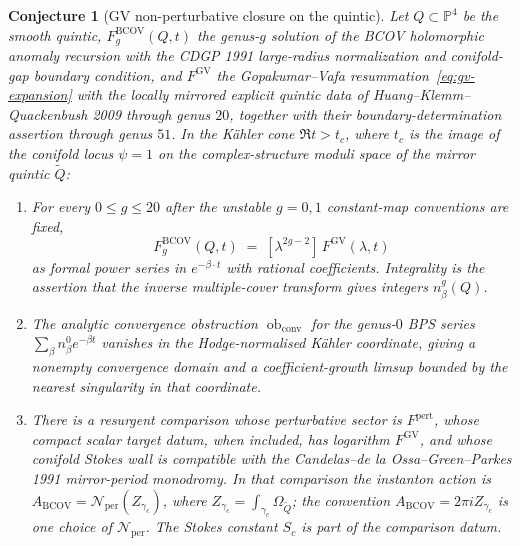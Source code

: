\documentclass[12pt]{amsart}
\newtheorem{conj}[thm]{Conjecture}
\theoremstyle{remark}
\renewcommand{\P}{\mathbb{P}}
\begin{document}
\begin{conj}[GV non-perturbative closure on the quintic]
  \label{conj:bcov-np-quintic}
  Let $Q \subset \P^4$ be the smooth quintic, $F^{\mathrm{BCOV}}_g(Q,
  t)$ the genus-$g$ solution of the BCOV holomorphic anomaly recursion
  with the CDGP 1991 large-radius normalization and conifold-gap boundary
  condition, and $F^{\mathrm{GV}}$ the Gopakumar--Vafa
  resummation~\eqref{eq:gv-expansion} with the locally mirrored
  explicit quintic data of Huang--Klemm--Quackenbush 2009 through
  genus \(20\), together with their boundary-determination assertion
  through genus \(51\).  In the K\"ahler cone $\Re t > t_c$, where $t_c$ is the image
  of the conifold locus $\psi = 1$ on the complex-structure moduli
  space of the mirror quintic $\widetilde Q$:
  \begin{enumerate}
    \item[(i)] For every $0 \leq g \leq 20$ after the unstable
      \(g=0,1\) constant-map conventions are fixed,
      \[
        F^{\mathrm{BCOV}}_g(Q, t) \;=\; [\lambda^{2g - 2}]\, F^{\mathrm{GV}}(\lambda, t)
      \]
      as formal power series in \(e^{-\beta\cdot t}\) with rational
      coefficients.  Integrality is the assertion that the inverse
      multiple-cover transform gives integers \(n_\beta^g(Q)\).
    \item[(ii)] The analytic convergence obstruction
      \(\operatorname{ob}_{\mathrm{conv}}\) for the genus-\(0\) BPS series
      \(\sum_\beta n_\beta^0 e^{-\beta t}\) vanishes in the
      Hodge-normalised K\"ahler coordinate, giving a nonempty convergence
      domain and a coefficient-growth limsup bounded by the nearest
      singularity in that coordinate.
    \item[(iii)] There is a resurgent comparison whose perturbative
      sector is \(F^{\mathrm{pert}}\), whose compact scalar target datum,
      when included, has logarithm \(F^{\mathrm{GV}}\), and whose conifold
      Stokes wall is compatible with the
      Candelas--de la Ossa--Green--Parkes 1991 mirror-period monodromy.
      In that comparison the instanton action
      is \(A_{\mathrm{BCOV}}=\mathcal N_{\mathrm{per}}(Z_{\gamma_c})\),
      where \(Z_{\gamma_c}=\int_{\gamma_c}\Omega_{\widetilde Q}\); the
      convention \(A_{\mathrm{BCOV}}=2\pi i Z_{\gamma_c}\) is one choice
      of \(\mathcal N_{\mathrm{per}}\).  The Stokes constant \(S_c\) is
      part of the comparison datum.
  \end{enumerate}
\end{conj}
\end{document}
